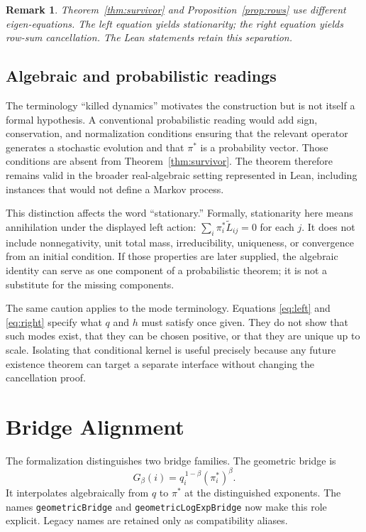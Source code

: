 \documentclass[10pt]{article}
\newtheorem{remark}{Remark}
\newcommand{\pistar}{\pi^{*}}
\newcommand{\Ltilde}{\widetilde L}
\begin{document}
\begin{remark}
Theorem~\ref{thm:survivor} and Proposition~\ref{prop:rows} use different
eigen-equations. The left equation yields stationarity; the right equation
yields row-sum cancellation. The Lean statements retain this separation.
\end{remark}

\subsection*{Algebraic and probabilistic readings}

The terminology ``killed dynamics'' motivates the construction but is not
itself a formal hypothesis. A conventional probabilistic reading would add
sign, conservation, and normalization conditions ensuring that the relevant
operator generates a stochastic evolution and that \(\pistar\) is a
probability vector. Those conditions are absent from
Theorem~\ref{thm:survivor}. The theorem therefore remains valid in the broader
real-algebraic setting represented in Lean, including instances that would not
define a Markov process.

This distinction affects the word ``stationary.'' Formally, stationarity here
means annihilation under the displayed left action:
\(\sum_i\pistar_i\Ltilde_{ij}=0\) for each \(j\). It does not include
nonnegativity, unit total mass, irreducibility, uniqueness, or convergence from
an initial condition. If those properties are later supplied, the algebraic
identity can serve as one component of a probabilistic theorem; it is not a
substitute for the missing components.

The same caution applies to the mode terminology. Equations
\eqref{eq:left} and \eqref{eq:right} specify what \(q\) and \(h\) must satisfy
once given. They do not show that such modes exist, that they can be chosen
positive, or that they are unique up to scale. Isolating that conditional
kernel is useful precisely because any future existence theorem can target a
separate interface without changing the cancellation proof.

\section{Bridge Alignment}

The formalization distinguishes two bridge families. The geometric bridge is
\begin{equation}\label{eq:geometric}
  G_\beta(i)=q_i^{\,1-\beta}(\pistar_i)^\beta.
\end{equation}
It interpolates algebraically from \(q\) to \(\pistar\) at the distinguished
exponents. The names \texttt{geometricBridge} and
\texttt{geometricLogExpBridge} now make this role explicit. Legacy names are
retained only as compatibility aliases.
\end{document}
